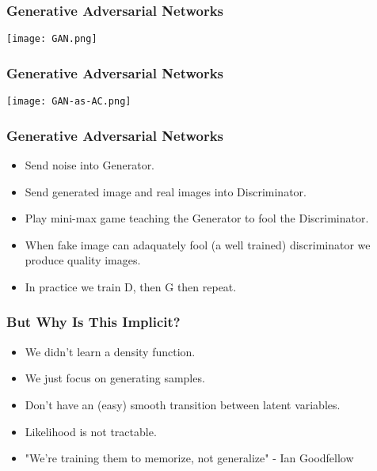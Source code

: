 \begin{frame}
    \frametitle{Generative Adversarial Networks}
    \center\texttt{[image: GAN.png]}
\end{frame}

\begin{frame}
    \frametitle{Generative Adversarial Networks}
    \center\texttt{[image: GAN-as-AC.png]}
\end{frame}

\begin{frame}
    \frametitle{Generative Adversarial Networks}
    \begin{itemize}
        \item Send noise into Generator.
        \item Send generated image and real images into Discriminator.
        \item Play mini-max game teaching the Generator to fool the
            Discriminator.
        \item When fake image can adaquately fool (a well trained) discriminator
            we produce quality images. 
        \item<2-> In practice we train D, then G then repeat. 
    \end{itemize}
\end{frame}

\begin{frame}
    \frametitle{But Why Is This Implicit?}
    \begin{itemize}
        \item We didn't learn a density function.
        \item We just focus on generating samples.
        \item Don't have an (easy) smooth transition between latent variables.
        \item Likelihood is not tractable.
        \item "We're training them to memorize, not generalize" - Ian Goodfellow
    \end{itemize}
\end{frame}


